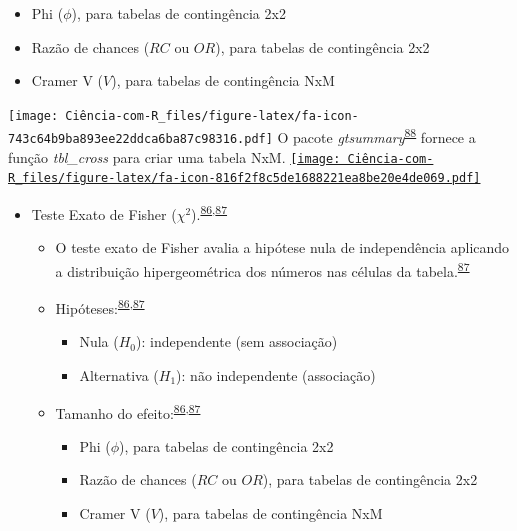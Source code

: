 \documentclass[
]{book}
\begin{document}
\begin{itemize}
\begin{itemize}
    \begin{itemize}
    \item
      Phi (\(\phi\)), para tabelas de contingência 2x2
    \item
      Razão de chances (\(RC\) ou \(OR\)), para tabelas de contingência 2x2
    \item
      Cramer V (\(V\)), para tabelas de contingência NxM
    \end{itemize}
  \end{itemize}
\end{itemize}

\texttt{[image: Ciência-com-R\_files/figure-latex/fa-icon-743c64b9ba893ee22ddca6ba87c98316.pdf]} O pacote \emph{gtsummary}\textsuperscript{\protect\hyperlink{ref-gtsummary}{88}} fornece a função \emph{tbl\_cross} para criar uma tabela NxM. \href{https://cran.r-project.org/web/packages/gtsummary/index.html}{\texttt{[image: Ciência-com-R\_files/figure-latex/fa-icon-816f2f8c5de1688221ea8be20e4de069.pdf]}}

\begin{itemize}
\item
  Teste Exato de Fisher (\(\chi^2\)).\textsuperscript{\protect\hyperlink{ref-McHugh2013}{86},\protect\hyperlink{ref-Kim2017a}{87}}

  \begin{itemize}
  \item
    O teste exato de Fisher avalia a hipótese nula de independência aplicando a distribuição hipergeométrica dos números nas células da tabela.\textsuperscript{\protect\hyperlink{ref-Kim2017a}{87}}
  \item
    Hipóteses:\textsuperscript{\protect\hyperlink{ref-McHugh2013}{86},\protect\hyperlink{ref-Kim2017a}{87}}

    \begin{itemize}
    \item
      Nula (\(H_{0}\)): independente (sem associação)
    \item
      Alternativa (\(H_{1}\)): não independente (associação)
    \end{itemize}
  \item
    Tamanho do efeito:\textsuperscript{\protect\hyperlink{ref-McHugh2013}{86},\protect\hyperlink{ref-Kim2017a}{87}}

    \begin{itemize}
    \item
      Phi (\(\phi\)), para tabelas de contingência 2x2
    \item
      Razão de chances (\(RC\) ou \(OR\)), para tabelas de contingência 2x2
    \item
      Cramer V (\(V\)), para tabelas de contingência NxM
    \end{itemize}
  \end{itemize}
\end{itemize}
\end{document}
